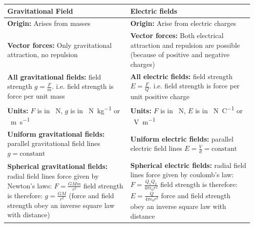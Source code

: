 \documentclass{scrbook}
\begin{document}
	\begin{tabular}{| p{0.5\linewidth} | p{0.5\linewidth} |}
		\hline
		Gravitational Field & Electric fields \\
		\hline \hline
		\textbf{Origin: } \newline Arises from masses & \textbf{Origin: } \newline Arise from electric charges \\ \hline
		\textbf{Vector forces: } \newline Only gravitational attraction, no repulsion & \textbf{Vector forces: } \newline Both electrical attraction and repulsion are possible (because of positive and negative charges) \\ \hline
		\textbf{All gravitational fields: } \newline field strength \newline $g = \frac{F}{m}$. \newline i.e. field strength is force per unit mass & \textbf{All electric fields: } \newline field strength \newline $E = \frac{F}{Q}$. \newline i.e. field strength is force per unit positive charge \\ \hline
		\textbf{Units: } \newline $F$ is in \SI{}{\newton}, $g$ is in \SI{}{\newton\per\kilo\gram} or \SI{}{\meter\per\second} & \textbf{Units: } \newline $F$ is in \SI{}{\newton}, $E$ is in \SI{}{\newton\per\coulomb} or \SI{}{\volt\per\meter} \\ \hline
		\textbf{Uniform gravitational fields: } \newline parallel gravitational field lines \newline $g = \text{constant}$ & \textbf{Uniform electric fields: } \newline parallel electric field lines \newline $E = \frac{V}{d} = \text{constant}$ \\ \hline
		\textbf{Spherical gravitational fields: } \newline radial field lines \newline force given by Newton's laws: $F = \frac{GMm}{r^2}$ \newline field strength is therefore: $g = \frac{GM}{r^2}$ \newline (force and field strength obey an inverse square law with distance) & \textbf{Spherical electric fields: } \newline radial field lines \newline force given by coulomb's law: $F = \frac{Q_1 Q_2}{4\pi \epsilon_0 r^2}$ \newline field strength is therefore: $E = \frac{Q}{4\pi \epsilon_0 r^2}$ \newline force and field strength obey an inverse square law with distance \\ \hline

\end{tabular}
\end{document}
